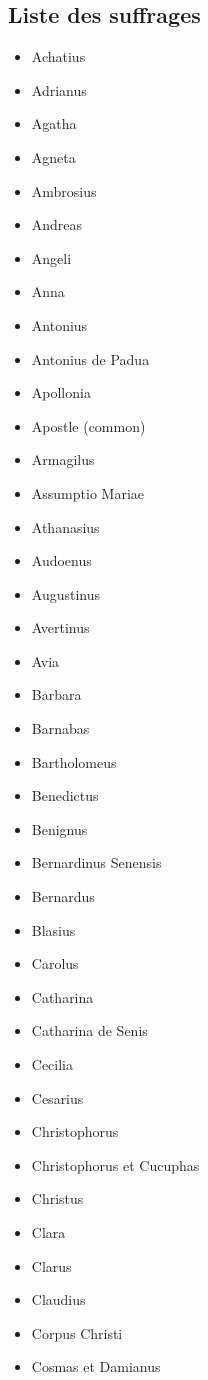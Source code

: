 \documentclass[a4paper,12pt,twoside]{book}
\begin{document}
	\subsection{Liste des suffrages}
	
	\begin{multicols}{2}
	\begin{itemize}
\item Achatius
\item Adrianus
\item Agatha
\item Agneta
\item Ambrosius
\item Andreas
\item Angeli
\item Anna
\item Antonius
\item Antonius de Padua
\item Apollonia
\item Apostle (common)
\item Armagilus
\item Assumptio Mariae
\item Athanasius
\item Audoenus
\item Augustinus
\item Avertinus
\item Avia
\item Barbara
\item Barnabas
\item Bartholomeus
\item Benedictus
\item Benignus
\item Bernardinus Senensis
\item Bernardus
\item Blasius
\item Carolus
\item Catharina
\item Catharina de Senis
\item Cecilia
\item Cesarius
\item Christophorus
\item Christophorus et Cucuphas
\item Christus
\item Clara 
\item Clarus
\item Claudius
\item Corpus Christi
\item Cosmas et Damianus

\end{itemize}
\end{multicols}
\end{document}
